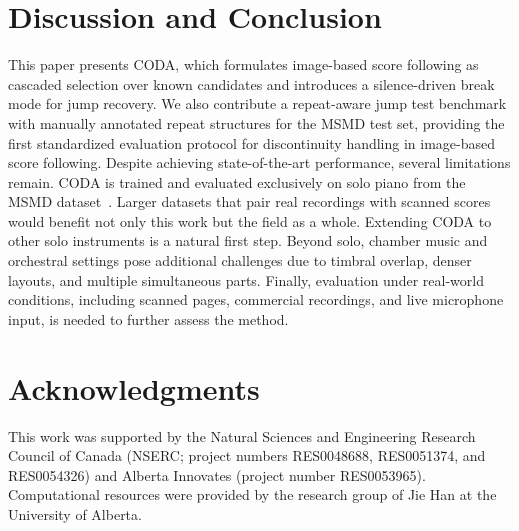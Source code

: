 \documentclass{article}
\begin{document}
\section{Discussion and Conclusion}\label{sec:conclusion}
This paper presents CODA, which formulates image-based score following as
cascaded selection over known candidates and introduces a silence-driven
break mode for jump recovery. We also contribute a repeat-aware jump test benchmark with manually annotated repeat structures for the MSMD test set, providing the first standardized evaluation protocol for discontinuity handling in image-based score following. Despite achieving state-of-the-art performance, several limitations remain. CODA is trained and evaluated exclusively on solo piano from the MSMD dataset~\cite{dorfer2018learning}. Larger datasets that pair real recordings with scanned scores would benefit not only this work but the field as a whole. Extending CODA to other solo instruments is a natural first step. Beyond solo, chamber music and orchestral settings pose additional challenges due to timbral overlap, denser layouts, and multiple simultaneous parts. Finally, evaluation under real-world conditions, including scanned pages, commercial recordings, and live microphone input, is needed to further assess the method.

\section{Acknowledgments}
This work was supported by the Natural Sciences and Engineering Research Council of Canada (NSERC; project numbers RES0048688, RES0051374, and RES0054326) and Alberta Innovates (project number RES0053965). Computational resources were provided by the research group of Jie Han at the University of Alberta.


\end{document}
